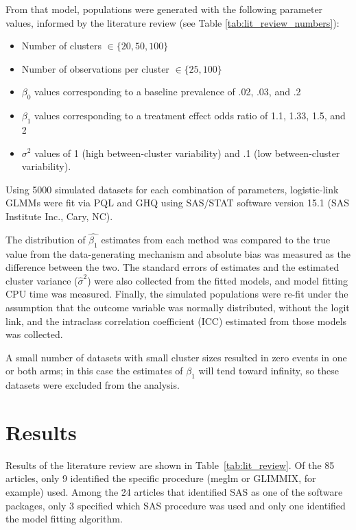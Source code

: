 \documentclass[Afour,times,sagev,doublespace]{sagej}
\begin{document}
From that model, populations were generated with the following parameter values, informed by the literature review (see Table \ref{tab:lit_review_numbers}):
\begin{itemize}
    \item Number of clusters $\in \{20, 50, 100\}$
    \item Number of observations per cluster $\in \{25, 100\}$
    \item $\beta_0$ values corresponding to a baseline prevalence of .02, .03, and .2
    \item $\beta_1$ values corresponding to a treatment effect odds ratio of 1.1, 1.33, 1.5, and 2
    \item $\sigma^2$ values of 1 (high between-cluster variability) and .1 (low between-cluster variability).
\end{itemize}

Using 5000 simulated datasets for each combination of parameters, logistic-link GLMMs were fit via PQL and GHQ using SAS/STAT software version 15.1 (SAS Institute Inc., Cary, NC).

The distribution of $\hat{\beta_1}$ estimates from each method was compared to the true value from the data-generating mechanism and absolute bias was measured as the difference between the two. The standard errors of estimates and the estimated cluster variance ($\hat{\sigma}^2$) were also collected from the fitted models, and model fitting CPU time was measured. Finally, the simulated populations were re-fit under the assumption that the outcome variable was normally distributed, without the logit link, and the intraclass correlation coefficient (ICC) estimated from those models was collected.

A small number of datasets with small cluster sizes resulted in zero events in one or both arms; in this case the estimates of $\beta_1$ will tend toward infinity, so these datasets were excluded from the analysis.





\section{Results}

Results of the literature review are shown in Table~\ref{tab:lit_review}. Of the 85 articles, only 9 identified the specific procedure (meglm or GLIMMIX, for example) used. Among the 24 articles that identified SAS as one of the software packages, only 3 specified which SAS procedure was used and only one identified the model fitting algorithm.
\end{document}
